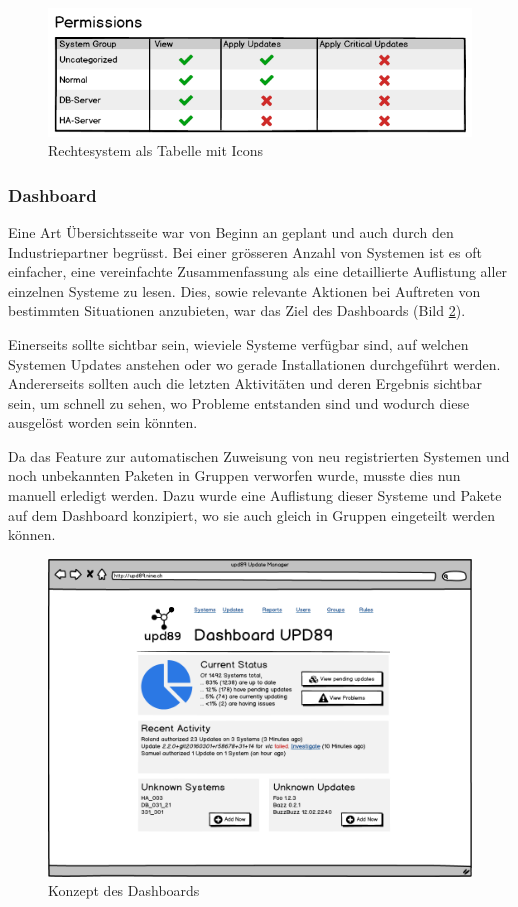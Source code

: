 \begin{figure}[H]
	\centering
	\includegraphics[width=0.75\linewidth]{files/mockups/permission_2}
	\caption{Rechtesystem als Tabelle mit Icons}
	\label{fig:design:permission_2}
\end{figure}

\subsubsection*{Dashboard}

Eine Art Übersichtsseite war von Beginn an geplant und auch durch den Industriepartner begrüsst. Bei einer grösseren Anzahl von Systemen ist es oft einfacher, eine vereinfachte Zusammenfassung als eine detaillierte Auflistung aller einzelnen Systeme zu lesen. Dies, sowie relevante Aktionen bei Auftreten von bestimmten Situationen anzubieten, war das Ziel des Dashboards (Bild \ref{fig:design:dashboard_mockup}).

Einerseits sollte sichtbar sein, wieviele Systeme verfügbar sind, auf welchen Systemen Updates anstehen oder wo gerade Installationen durchgeführt werden. Andererseits sollten auch die letzten Aktivitäten und deren Ergebnis sichtbar sein, um schnell zu sehen, wo Probleme entstanden sind und wodurch diese ausgelöst worden sein könnten.

Da das Feature zur automatischen Zuweisung von neu registrierten Systemen und noch unbekannten Paketen in Gruppen verworfen wurde, musste dies nun manuell erledigt werden. Dazu wurde eine Auflistung dieser Systeme und Pakete auf dem Dashboard konzipiert, wo sie auch gleich in Gruppen eingeteilt werden können. 

\begin{figure}[H]
	\centering
	\includegraphics[width=\linewidth]{files/mockups/dashboard}
	\caption{Konzept des Dashboards}
	\label{fig:design:dashboard_mockup}
\end{figure}

